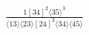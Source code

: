 \documentclass[varwidth, border=5pt]{standalone}
\begin{document}
\begin{my}
$\begin{gathered}
\scriptscriptstyle\frac{1[34]^2⟨35⟩^3}{⟨13⟩⟨23⟩[24]^2⟨34⟩⟨45⟩}
\end{gathered}$
\end{my}
\end{document}
